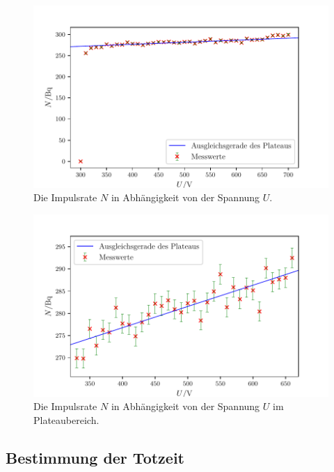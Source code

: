 \begin{figure}
	\centering
	\includegraphics[width=\linewidth-50pt,height=\textheight-50pt,keepaspectratio]{content/images/Graph1.1.pdf}
	\caption{Die Impulsrate $N$ in Abhängigkeit von der Spannung $U$.}
	\label{fig:Graph1.1}
\end{figure}

\begin{figure}
	\centering
	\includegraphics[width=\linewidth-50pt,height=\textheight-50pt,keepaspectratio]{content/images/Graph1.2.pdf}
	\caption{Die Impulsrate $N$ in Abhängigkeit von der Spannung $U$ im Plateaubereich.}
	\label{fig:Graph1.2}
\end{figure}

\subsection{Bestimmung der Totzeit}

